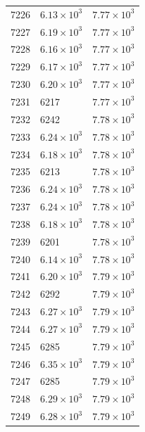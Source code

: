 \begin{table}[H]
\begin{tabular}{lll}
7226 & $\displaystyle 6.13 \times 10^{3}$ & $\displaystyle 7.77 \times 10^{3}$ \\
7227 & $\displaystyle 6.19 \times 10^{3}$ & $\displaystyle 7.77 \times 10^{3}$ \\
7228 & $\displaystyle 6.16 \times 10^{3}$ & $\displaystyle 7.77 \times 10^{3}$ \\
7229 & $\displaystyle 6.17 \times 10^{3}$ & $\displaystyle 7.77 \times 10^{3}$ \\
7230 & $\displaystyle 6.20 \times 10^{3}$ & $\displaystyle 7.77 \times 10^{3}$ \\
7231 & 6217 & $\displaystyle 7.77 \times 10^{3}$ \\
7232 & 6242 & $\displaystyle 7.78 \times 10^{3}$ \\
7233 & $\displaystyle 6.24 \times 10^{3}$ & $\displaystyle 7.78 \times 10^{3}$ \\
7234 & $\displaystyle 6.18 \times 10^{3}$ & $\displaystyle 7.78 \times 10^{3}$ \\
7235 & 6213 & $\displaystyle 7.78 \times 10^{3}$ \\
7236 & $\displaystyle 6.24 \times 10^{3}$ & $\displaystyle 7.78 \times 10^{3}$ \\
7237 & $\displaystyle 6.24 \times 10^{3}$ & $\displaystyle 7.78 \times 10^{3}$ \\
7238 & $\displaystyle 6.18 \times 10^{3}$ & $\displaystyle 7.78 \times 10^{3}$ \\
7239 & 6201 & $\displaystyle 7.78 \times 10^{3}$ \\
7240 & $\displaystyle 6.14 \times 10^{3}$ & $\displaystyle 7.78 \times 10^{3}$ \\
7241 & $\displaystyle 6.20 \times 10^{3}$ & $\displaystyle 7.79 \times 10^{3}$ \\
7242 & 6292 & $\displaystyle 7.79 \times 10^{3}$ \\
7243 & $\displaystyle 6.27 \times 10^{3}$ & $\displaystyle 7.79 \times 10^{3}$ \\
7244 & $\displaystyle 6.27 \times 10^{3}$ & $\displaystyle 7.79 \times 10^{3}$ \\
7245 & 6285 & $\displaystyle 7.79 \times 10^{3}$ \\
7246 & $\displaystyle 6.35 \times 10^{3}$ & $\displaystyle 7.79 \times 10^{3}$ \\
7247 & 6285 & $\displaystyle 7.79 \times 10^{3}$ \\
7248 & $\displaystyle 6.29 \times 10^{3}$ & $\displaystyle 7.79 \times 10^{3}$ \\
7249 & $\displaystyle 6.28 \times 10^{3}$ & $\displaystyle 7.79 \times 10^{3}$ \\

\end{tabular}
\end{table}
